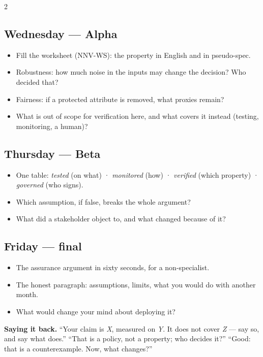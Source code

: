 \documentclass[11pt]{article}
\begin{document}
\begin{multicols}{2}
\columnbreak
\subsection*{Wednesday — Alpha}
\begin{itemize}
  \item Fill the worksheet (NNV-WS): the property in English and in pseudo-spec.
  \item Robustness: how much noise in the inputs may change the decision? Who decided that?
  \item Fairness: if a protected attribute is removed, what proxies remain?
  \item What is out of scope for verification here, and what covers it instead (testing, monitoring, a human)?
\end{itemize}

\subsection*{Thursday — Beta}
\begin{itemize}
  \item One table: \emph{tested} (on what) · \emph{monitored} (how) · \emph{verified} (which property) · \emph{governed} (who signs).
  \item Which assumption, if false, breaks the whole argument?
  \item What did a stakeholder object to, and what changed because of it?
\end{itemize}

\subsection*{Friday — final}
\begin{itemize}
  \item The assurance argument in sixty seconds, for a non-specialist.
  \item The honest paragraph: assumptions, limits, what you would do with another month.
  \item What would change your mind about deploying it?
\end{itemize}

\begin{notebox}\footnotesize
\textbf{Saying it back.} ``Your claim is \emph{X}, measured on \emph{Y}. It does not cover \emph{Z} — say so, and say what does.'' \quad ``That is a policy, not a property; who decides it?'' \quad ``Good: that is a counterexample. Now, what changes?''
\end{notebox}
\end{multicols}
\end{document}
